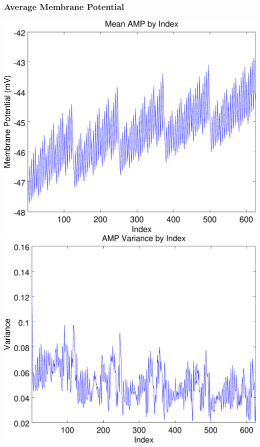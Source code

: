\documentclass{beamer}
\theoremstyle{plain}
\theoremstyle{definition}
\begin{document}
\begin{frame}\frametitle{Average Membrane Potential}
  \begin{center}
    \includegraphics[scale=.32]{AMP.pdf}%
    \includegraphics[scale=.32]{AMPVariance.pdf}
  \end{center}
\end{frame}
\end{document}
